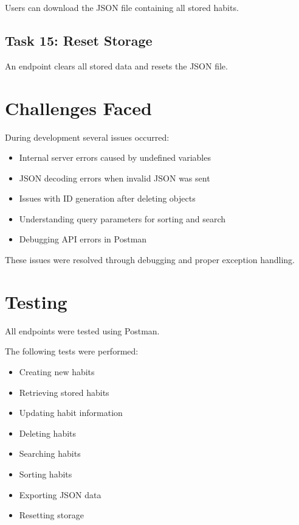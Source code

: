 \documentclass[12pt]{article}
\begin{document}
Users can download the JSON file containing all stored habits.

\subsection{Task 15: Reset Storage}

An endpoint clears all stored data and resets the JSON file.

\section{Challenges Faced}

During development several issues occurred:

\begin{itemize}

\item Internal server errors caused by undefined variables
\item JSON decoding errors when invalid JSON was sent
\item Issues with ID generation after deleting objects
\item Understanding query parameters for sorting and search
\item Debugging API errors in Postman

\end{itemize}

These issues were resolved through debugging and proper exception handling.

\section{Testing}

All endpoints were tested using Postman.

The following tests were performed:

\begin{itemize}

\item Creating new habits
\item Retrieving stored habits
\item Updating habit information
\item Deleting habits
\item Searching habits
\item Sorting habits
\item Exporting JSON data
\item Resetting storage

\end{itemize}
\end{document}

